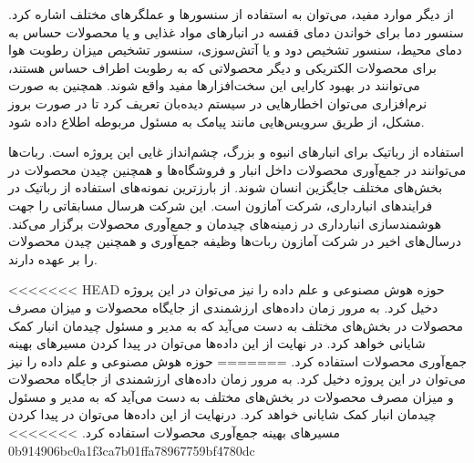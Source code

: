 از دیگر موارد مفید، می‌توان به استفاده از سنسورها و عملگرهای مختلف اشاره کرد. سنسور دما برای خواندن دمای قفسه در انبارهای مواد غذایی و یا محصولات حساس به دمای محیط، سنسور تشخیص دود و یا آتش‌سوزی، سنسور تشخیص میزان رطوبت هوا برای محصولات الکتریکی و دیگر محصولاتی که به رطوبت اطراف حساس هستند، می‌توانند در بهبود  کارایی این سخت‌افزارها مفید واقع شوند. همچنین به صورت نرم‌افزاری می‌توان اخطارهایی در سیستم دیده‌بان تعریف کرد تا در صورت بروز مشکل، از طریق سرویس‌هایی مانند پیامک به مسئول مربوطه اطلاع داده شود.

استفاده از رباتیک برای انبارهای انبوه و بزرگ، چشم‌انداز غایی این پروژه است. ربات‌ها می‌توانند در جمع‌آوری محصولات داخل انبار و فروشگاه‌ها و همچنین چیدن محصولات در بخش‌های مختلف جایگزین انسان شوند. از بارزترین نمونه‌های استفاده از رباتیک در فرایندهای انبارداری، شرکت آمازون است. این شرکت هرسال مسابقاتی را جهت هوشمندسازی انبارداری در زمینه‌های چیدمان و جمع‌آوری محصولات برگزار می‌کند. درسال‌های اخیر در شرکت آمازون ربات‌ها وظیفه جمع‌آوری و همچنین چیدن محصولات را بر عهده دارند\cite{Amazon}.

<<<<<<< HEAD
حوزه هوش مصنوعی و علم داده را نیز می‌توان در این پروژه دخیل کرد. به مرور زمان داده‌های ارزشمندی از جایگاه محصولات و میزان مصرف محصولات در بخش‌های مختلف به دست می‌آید که به مدیر و مسئول چیدمان انبار کمک شایانی خواهد کرد. در نهایت از این داده‌ها می‌توان در پیدا کردن مسیرهای بهینه جمع‌آوری محصولات استفاده کرد.
=======
حوزه هوش مصنوعی و علم داده را نیز می‌توان در این پروژه دخیل کرد. به مرور زمان داده‌های ارزشمندی از جایگاه محصولات و میزان مصرف محصولات در بخش‌های مختلف به دست می‌آید که به مدیر و مسئول چیدمان انبار کمک شایانی خواهد کرد. درنهایت از این داده‌ها می‌توان در پیدا کردن مسیرهای بهینه جمع‌آوری محصولات استفاده کرد.
>>>>>>> 0b914906bc0a1f3ca7b01ffa78967759bf4780dc

